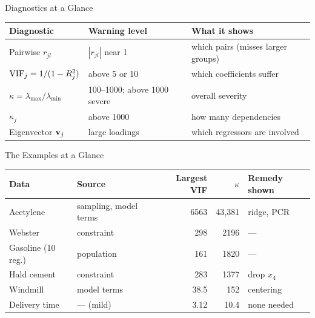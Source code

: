 \begin{frame}{Diagnostics at a Glance}
    \begin{center}
        \footnotesize
        \begin{tabular}{lll}
            \toprule
            Diagnostic & Warning level & What it shows \\
            \midrule
            Pairwise $r_{jl}$ & $|r_{jl}|$ near 1 & which pairs (misses larger groups) \\
            $\mathrm{VIF}_j=1/(1-R_j^2)$ & above 5 or 10 & which coefficients suffer \\
            $\kappa=\lambda_{\max}/\lambda_{\min}$ & 100--1000; above 1000 severe & overall severity \\
            $\kappa_j$ & above 1000 & how many dependencies \\
            Eigenvector $\mathbf{v}_j$ & large loadings & which regressors are involved \\
            \bottomrule
        \end{tabular}
    \end{center}
\end{frame}


\begin{frame}{The Examples at a Glance}
    \begin{center}
        \footnotesize
        \begin{tabular}{llrrl}
            \toprule
            Data & Source & Largest VIF & $\kappa$ & Remedy shown \\
            \midrule
            Acetylene & sampling, model terms & 6563 & 43{,}381 & ridge, PCR \\
            Webster & constraint & 298 & 2196 & --- \\
            Gasoline (10 reg.) & population & 161 & 1820 & --- \\
            Hald cement & constraint & 283 & 1377 & drop $x_4$ \\
            Windmill & model terms & 38.5 & 152 & centering \\
            Delivery time & --- (mild) & 3.12 & 10.4 & none needed \\
            \bottomrule
        \end{tabular}
    \end{center}
\end{frame}


